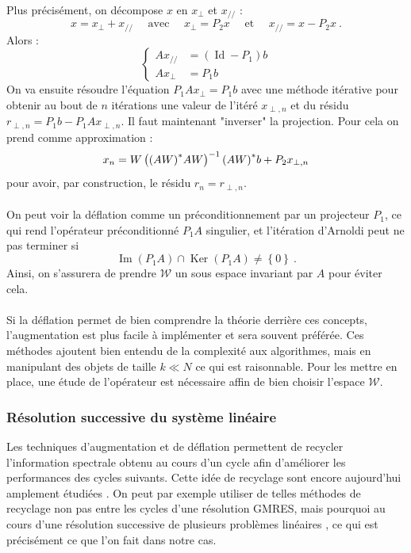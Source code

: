       \paragraph{}
      Plus précisément, on décompose $x$ en $x_\perp$ et $x_{//}$ :
      \[x = x_\perp + x_{//}\quad\text{ avec }\quad x_\perp = P_2x\quad\text{ et }\quad x_{//} = x - P_2x\ .\]
      Alors :
      \begin{equation*}
        \left\{
        \begin{aligned}
          Ax_{//} &= \left(\operatorname{Id} - P_1\right)b \\
          Ax_\perp &= P_1b
        \end{aligned}
        \right.
      \end{equation*}
      On va ensuite résoudre l'équation $P_1Ax_\perp = P_1b$ avec une méthode itérative pour obtenir au bout de $n$ itérations une valeur de l'itéré $x_{\perp, n}$ et du résidu $r_{\perp, n} = P_1b - P_1Ax_{\perp, n}$.
      Il faut maintenant "inverser" la projection.
      Pour cela on prend comme approximation :
      $$x_n = W\left({\left(AW\right)}^*AW\right)^{-1}{\left(AW\right)}^*b + P_2x_{\perp, n}$$
      pour avoir, par construction, le résidu $r_n = r_{\perp, n}$.

      \paragraph{}
      On peut voir la déflation comme un préconditionnement par un projecteur $P_1$, ce qui rend l'opérateur préconditionné $P_1A$ singulier, et l'itération d'Arnoldi peut ne pas terminer si
      \[\operatorname{Im}\left(P_1A\right) \cap \operatorname{Ker}\left(P_1A\right) \neq \left\{0\right\}\ .\]
      Ainsi, on s'assurera de prendre $\mathcal{W}$ un sous espace invariant par $A$ pour éviter cela.


    \paragraph{}
    Si la déflation permet de bien comprendre la théorie derrière ces concepts, l'augmentation est plus facile à implémenter et sera souvent préférée.
    Ces méthodes ajoutent bien entendu de la complexité aux algorithmes, mais en manipulant des objets de taille $k \ll N$ ce qui est raisonnable.
    Pour les mettre en place, une étude de l'opérateur est nécessaire affin de bien choisir l'espace $\mathcal{W}$.


    \subsubsection{Résolution successive du système linéaire}
    Les techniques d'augmentation et de déflation permettent de recycler l'information spectrale obtenu au cours d'un cycle afin d'améliorer les performances des cycles suivants.
    Cette idée de recyclage sont encore aujourd'hui amplement étudiées \cite{JolivetTournier2016}.
    On peut par exemple utiliser de telles méthodes de recyclage non pas entre les cycles d'une résolution GMRES, mais pourquoi au cours d'une résolution successive de plusieurs problèmes linéaires \cite{Gaul2014}, ce qui est précisément ce que l'on fait dans notre cas.
